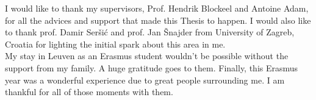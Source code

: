 \documentclass[master=mai,english,openright,fleqn,inputenc=utf8]{kulemt}
\begin{document}

\begin{preface}

	I would like to thank my supervisors, Prof. Hendrik Blockeel and Antoine Adam, for all the advices and support that made this Thesis to happen. I would also like to thank prof. Damir Ser\v{s}i\'{c} and prof. Jan \v{S}najder from University of Zagreb, Croatia for lighting the initial spark about this area in me. \\
	
	My stay in Leuven as an Erasmus student wouldn't be possible without the support from my family. A huge gratitude  goes to them. Finally, this Erasmus year was a wonderful experience due to great people surrounding me. I am thankful for all of those moments with them.
\end{preface}

\tableofcontents*
\end{document}
